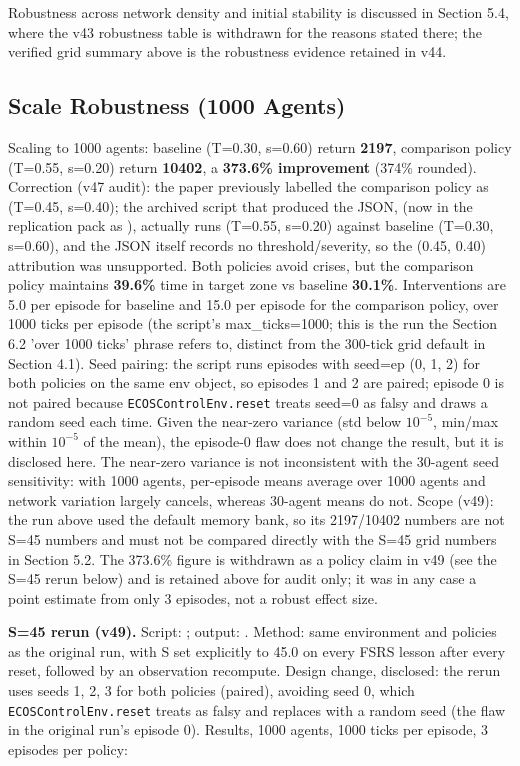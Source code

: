 \documentclass[11pt]{article}
\begin{document}
Robustness across network density and initial stability is discussed in Section 5.4, where the v43 robustness table is withdrawn for the reasons stated there; the verified grid summary above is the robustness evidence retained in v44.

\subsection{Scale Robustness (1000 Agents)}
Scaling to 1000 agents: baseline (T=0.30, s=0.60) return \textbf{2197}, comparison policy (T=0.55, s=0.20) return \textbf{10402}, a \textbf{373.6\% improvement} (374\% rounded). Correction (v47 audit): the paper previously labelled the comparison policy as (T=0.45, s=0.40); the archived script that produced the JSON,  (now in the replication pack as ), actually runs (T=0.55, s=0.20) against baseline (T=0.30, s=0.60), and the JSON itself records no threshold/severity, so the (0.45, 0.40) attribution was unsupported. Both policies avoid crises, but the comparison policy maintains \textbf{39.6\%} time in target zone vs baseline \textbf{30.1\%}. Interventions are 5.0 per episode for baseline and 15.0 per episode for the comparison policy, over 1000 ticks per episode (the script's max\_ticks=1000; this is the run the Section 6.2 'over 1000 ticks' phrase refers to, distinct from the 300-tick grid default in Section 4.1). Seed pairing: the script runs episodes with seed=ep (0, 1, 2) for both policies on the same env object, so episodes 1 and 2 are paired; episode 0 is not paired because \texttt{ECOSControlEnv.reset} treats seed=0 as falsy and draws a random seed each time. Given the near-zero variance (std below $10^{-5}$, min/max within $10^{-5}$ of the mean), the episode-0 flaw does not change the result, but it is disclosed here. The near-zero variance is not inconsistent with the 30-agent seed sensitivity: with 1000 agents, per-episode means average over 1000 agents and network variation largely cancels, whereas 30-agent means do not. Scope (v49): the run above used the default memory bank, so its 2197/10402 numbers are not S=45 numbers and must not be compared directly with the S=45 grid numbers in Section 5.2. The 373.6\% figure is withdrawn as a policy claim in v49 (see the S=45 rerun below) and is retained above for audit only; it was in any case a point estimate from only 3 episodes, not a robust effect size.

\textbf{S=45 rerun (v49).} Script: ; output: . Method: same environment and policies as the original run, with S set explicitly to 45.0 on every FSRS lesson after every reset, followed by an observation recompute. Design change, disclosed: the rerun uses seeds 1, 2, 3 for both policies (paired), avoiding seed 0, which \texttt{ECOSControlEnv.reset} treats as falsy and replaces with a random seed (the flaw in the original run's episode 0). Results, 1000 agents, 1000 ticks per episode, 3 episodes per policy:
\end{document}
